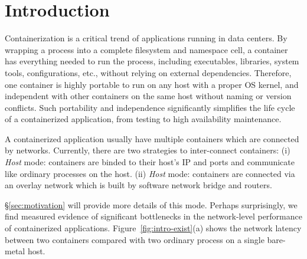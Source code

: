 \section{Introduction} \label{sec:introduction}


Containerization is a critical trend of applications running in data centers.
By wrapping a process into a complete filesystem and namespace cell, a container
has everything needed to run the process, including executables, libraries, system
tools, configurations, etc., without relying on external dependencies. 
Therefore, one container
is highly portable to run on any host with a proper OS kernel, and independent
with other containers on the same host without naming or version conflicts.
Such portability and independence significantly simplifies the life cycle of
a containerized application, from testing to high availability maintenance.

A containerized application usually have multiple containers which are connected
by networks. Currently, there are two strategies to inter-connect containers:
(i) {\em Host} mode: containers are binded to their host's IP and ports
and communicate like ordinary processes on the host. 
(ii) {\em Host} mode: containers are connected via an overlay network which 
is built by software network bridge and routers. 

\S\ref{sec:motivation} will provide more details of this mode.
Perhaps surprisingly, we find measured evidence of significant bottlenecks in the network-level performance of containerized applications.
Figure~\ref{fig:intro-exist}(a) shows the network latency between two containers
compared with two ordinary process on a single bare-metal host. 


